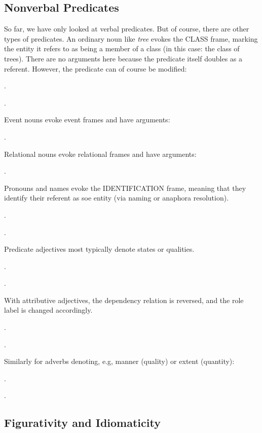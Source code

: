 \documentclass[a4paper]{article}
\newcommand{\fr}[1]{\textsf{#1}}
\newcommand{\rl}[1]{\textsf{#1}}
\begin{document}
\subsection{Nonverbal Predicates}

So far, we have only looked at verbal predicates. But of course, there are other types of predicates. An ordinary noun like \emph{tree} evokes the \fr{CLASS} frame, marking the entity it refers to as being a member of a class (in this case: the class of trees). There are no arguments here because the predicate itself doubles as a referent. However, the predicate can of course be modified:

\ex.

\ex.

Event nouns evoke event frames and have arguments:

\ex.

Relational nouns evoke relational frames and have arguments:

\ex.

Pronouns and names evoke the \fr{IDENTIFICATION} frame, meaning that they
identify their referent as soe entity (via naming or anaphora resolution).

\ex.

\ex.

Predicate adjectives most typically denote states or qualities.

\ex.

\ex.

With attributive adjectives, the dependency relation is reversed, and the role label is changed accordingly.

\ex.

\ex.

Similarly for adverbs denoting, e.g, manner (\rl{quality}) or extent (\rl{quantity}):

\ex.

\ex.

\subsection{Figurativity and Idiomaticity}
\end{document}
